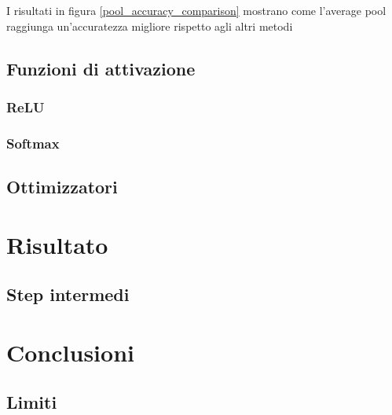 \documentclass[a4paper,12pt]{article}
\begin{document}
I risultati in figura \ref{pool_accuracy_comparison} mostrano come l'average pool raggiunga un'accuratezza migliore rispetto agli altri metodi 

\subsection{Funzioni di attivazione}
\subsubsection{ReLU}
\subsubsection{Softmax}
\subsection{Ottimizzatori}

\section{Risultato}
\subsection{Step intermedi}

\section{Conclusioni}
\subsection{Limiti}
\end{document}
